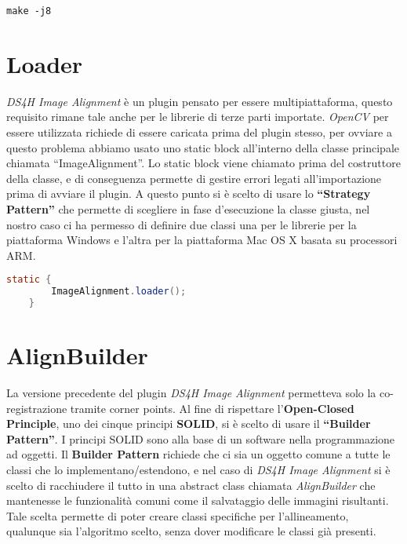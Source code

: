 \begin{lstlisting}[label={lst:compile}, caption={Esempio compilazione sorgente per piattaforma MacOs X con processore M1, usufruibile anche per altre piattaforme UNIX e LINUX}]
    make -j8
\end{lstlisting}

\section{Loader}
\noindent \textit{DS4H Image Alignment} è un plugin pensato per essere multipiattaforma, questo requisito rimane tale anche per le librerie di terze parti importate. \textit{OpenCV} per essere utilizzata richiede di essere caricata prima del plugin stesso, per ovviare a questo problema abbiamo usato uno static block all'interno della classe principale chiamata ``ImageAlignment''. Lo static block viene chiamato prima del costruttore della classe, e di conseguenza permette di gestire errori legati all'importazione prima di avviare il plugin. 
A questo punto si è scelto di usare lo \textbf{``Strategy Pattern''} che permette di scegliere in fase d'esecuzione la classe giusta, nel nostro caso ci ha permesso di definire due classi una per le librerie per la piattaforma Windows e l'altra per la piattaforma Mac OS X basata su processori ARM\@.

\begin{lstlisting}[language=Java,label={lst:static-call}, caption={Esempio di static block proveniente dal nostro caso di studio}]
    static {
        ImageAlignment.loader();
    }
\end{lstlisting}

\section{AlignBuilder}
\noindent La versione precedente del plugin \textit{DS4H Image Alignment} permetteva solo la co-registrazione tramite corner points. Al fine di rispettare l'\textbf{Open-Closed Principle}, uno dei cinque principi \textbf{SOLID}, si è scelto di usare il \textbf{``Builder Pattern''}. I principi SOLID sono alla base di un software nella programmazione ad oggetti. Il \textbf{Builder Pattern} richiede che ci sia un oggetto comune a tutte le classi che lo implementano/estendono, e nel caso di \textit{DS4H Image Alignment} si è scelto di racchiudere il tutto in una abstract class chiamata \textit{AlignBuilder} che mantenesse le funzionalità comuni come il salvataggio delle immagini risultanti. Tale scelta permette di poter creare classi specifiche per l'allineamento, qualunque sia l'algoritmo scelto, senza dover modificare le classi già presenti.

